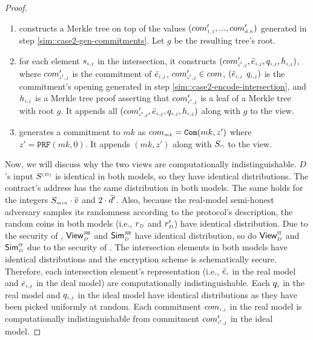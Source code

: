 \begin{proof}
\begin{enumerate}
 
 
 \item constructs a  Merkle tree on top of the values $(com'_{\scriptscriptstyle 1,1}, ..., com'_{\scriptscriptstyle d, h})$ generated in step \ref{sim::case2-gen-commitments}. Let $g$ be the resulting tree's root.  
 \item for each element $s_{\scriptscriptstyle i,j}$ in the intersection, it constructs $(com'_{\scriptscriptstyle i',j}, \bar{e}_{\scriptscriptstyle i,j}, q_{\scriptscriptstyle i,j}, h_{\scriptscriptstyle i,j})$, where $com'_{\scriptscriptstyle i',j}$ is the commitment of $ \bar{e}_{\scriptscriptstyle i,j}$, $com'_{\scriptscriptstyle i',j}\in com$,  $(\bar{e}_{\scriptscriptstyle i,j}$ $q_{\scriptscriptstyle i,j})$ is the commitment's opening generated in step \ref{sim::case2-encode-intersection}, and $h_{\scriptscriptstyle i,j}$ is a Merkle tree proof asserting that $com'_{\scriptscriptstyle i',j}$ is a leaf of a Merkle tree with root $g$. It appends all  $(com'_{\scriptscriptstyle i',j}, \bar{e}_{\scriptscriptstyle i,j}, q_{\scriptscriptstyle i,j}, h_{\scriptscriptstyle i,j})$ along with $g$ to the view. 
 
\item generates a commitment to $mk$ as $com_{\scriptscriptstyle mk}=\mathtt{Com}(mk, z')$ where $z'=\mathtt{PRF}(mk, 0)$. It appends $(mk, z')$ along with $S_{\scriptscriptstyle \cap}$ to the view. 

%
\end{enumerate}
 

 Now, we will discuss why the two views are computationally indistinguishable.  $D$'s input $S^{\scriptscriptstyle (D)}$ is
 identical in both models, so they have identical distributions.  The contract's address has the same distribution in both models. The same holds for the integers $S_{\scriptscriptstyle min}\cdot \ddot{v}$ and $ 2\cdot \ddot{d}'$. Also, because the real-model semi-honest adversary samples its randomness according to the protocol’s description, the random coins in both models (i.e., $r_{\scriptscriptstyle D}$  and $r'_{\scriptscriptstyle D}$) have identical distribution. Due to the security of \fpsi, $\mathsf{View}^{\scriptscriptstyle \mathtt{JUS}}_{\scriptscriptstyle D}$ and $\mathsf{Sim}^{\scriptscriptstyle \mathtt{JUS}}_{\scriptscriptstyle D}$ have identical distribution, so do  $\mathsf{View}^{\scriptscriptstyle \mathtt{CT}}_{\scriptscriptstyle D}$ and $\mathsf{Sim}^{\scriptscriptstyle \mathtt{CT}}_{\scriptscriptstyle D}$ due to the security of \ct. The intersection elements in both models have identical distributions and the encryption scheme is schematically secure. Therefore, each intersection element's representation (i.e., $\bar{e}_{\scriptscriptstyle i}$ in the real model and $\bar{e}_{\scriptscriptstyle i, j}$ in the deal model) are computationally indistinguishable. Each $q_{\scriptscriptstyle i}$ in the real model and $q_{\scriptscriptstyle i, j}$ in the ideal model have identical distributions as they have been picked uniformly at random. Each commitment $com_{\scriptscriptstyle i,j}$ in the real model is computationally indistinguishable from commitment $com'_{\scriptscriptstyle i',j}$ in the ideal model. 
 

\end{proof}
